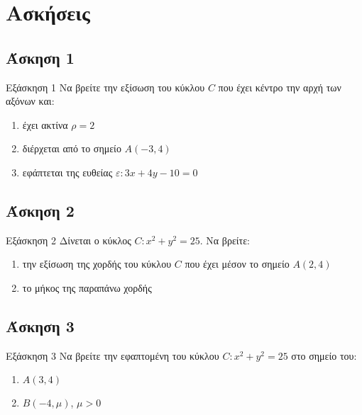 \documentclass[greek]{beamer}
\begin{document}
\section{Ασκήσεις}
\subsection{Άσκηση 1}
\begin{frame}[label=Άσκηση1,t]{Εξάσκηση 1}
  Να βρείτε την εξίσωση του κύκλου $C$ που έχει κέντρο την αρχή των αξόνων και:
  \begin{enumerate}
    \item<1-> έχει ακτίνα $ρ=2$
    \item<2-> διέρχεται από το σημείο $Α(-3,4)$
    \item<3-> εφάπτεται της ευθείας $ε:3x+4y-10=0$
  \end{enumerate}

\end{frame}

\subsection{Άσκηση 2}
\begin{frame}[label=Άσκηση2,t]{Εξάσκηση 2}
  Δίνεται ο κύκλος $C:x^2+y^2=25$. Να βρείτε:
  \begin{enumerate}
    \item<1-> την εξίσωση της χορδής του κύκλου $C$ που έχει μέσον το σημείο $Α(2,4)$
    \item<2-> το μήκος της παραπάνω χορδής
  \end{enumerate}

\end{frame}

\subsection{Άσκηση 3}
\begin{frame}[label=Άσκηση3,t]{Εξάσκηση 3}
  Να βρείτε την εφαπτομένη του κύκλου $C:x^2+y^2=25$ στο σημείο του:
  \begin{enumerate}
    \item<1-> $Α(3,4)$
    \item<2-> $Β(-4,μ)$, $μ>0$
  \end{enumerate}

\end{frame}
\end{document}
